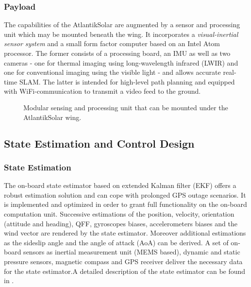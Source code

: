 \subsubsection{Payload}
The capabilities of the AtlantikSolar are augmented by a sensor and processing unit which may be mounted beneath the wing. It incorporates a \emph{visual-inertial sensor system} \cite{nikolic2014synchronized} and a small form factor computer based on an Intel Atom processor. The former consists of a processing board, an IMU as well as two cameras - one for thermal imaging using long-wavelength infrared (LWIR) and one for conventional imaging using the visible light - and allows accurate real-time SLAM\cite{Leutenegger_PhD}. The latter is intended for high-level path planning and equipped with WiFi-communication to transmit a video feed to the ground.
\begin{figure}[!htb]
  \begin{center}
  \def\svgwidth{\columnwidth}
  
  \end{center}
  \caption[Modular sensing and processing unit.]{Modular sensing and processing unit that can be mounted under the AtlantikSolar wing.}
  \label{f:03_sensor_pod}
\end{figure}
  
\subsection{State Estimation and Control Design}

\subsubsection{State Estimation} \label{secsec:StateEstimation}
The on-board state estimator based on extended Kalman filter (EKF) offers a robust estimation solution and can cope with prolonged GPS outage scenarios. It is implemented and optimized in order to grant full functionality on the on-board computation unit. 
Successive estimations of the position, velocity, orientation (attitude and heading), QFF, gyroscopes biases, accelerometers biases and the wind vector are rendered by the state estimator. Moreover additional estimations as the sideslip angle and the angle of attack (AoA) can be derived. A set of on-board sensors as inertial measurement unit (MEMS based), dynamic and static pressure sensors, magnetic compass and GPS receiver deliver the necessary data for the state estimator.A detailed description of the state estimator can be found in  \cite{Leutenegger_MSC2014}.
  
